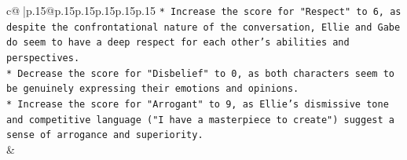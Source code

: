 \documentclass{article}
\begin{document}
{\begin{supertabular}{c@{$\;$}|p{.15\linewidth}@{}p{.15\linewidth}p{.15\linewidth}p{.15\linewidth}p{.15\linewidth}p{.15\linewidth}}
{{{\texttt{* Increase the score for "Respect" to 6, as despite the confrontational nature of the conversation, Ellie and Gabe do seem to have a deep respect for each other's abilities and perspectives.} \\
\texttt{* Decrease the score for "Disbelief" to 0, as both characters seem to be genuinely expressing their emotions and opinions.} \\
\texttt{* Increase the score for "Arrogant" to 9, as Ellie's dismissive tone and competitive language ("I have a masterpiece to create") suggest a sense of arrogance and superiority.} \\
            }
        }
    }
    & \\ \\

\end{supertabular}
}
\end{document}
